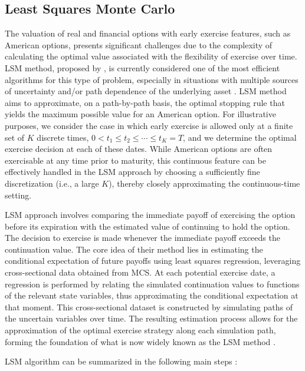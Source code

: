 \documentclass[pdflatex,sn-basic]{sn-jnl}%
\theoremstyle{thmstyleone}%
\theoremstyle{thmstyletwo}%
\theoremstyle{thmstylethree}%
\begin{document}
 

\subsection{Least Squares Monte Carlo}\label{subsec45}

The valuation of real and financial options with early exercise features, such as American options, presents significant challenges due to the complexity of calculating the optimal value associated with the flexibility of exercise over time. LSM method, proposed by \cite{ref14}, is currently considered one of the most efficient algorithms for this type of problem, especially in situations with multiple sources of uncertainty and/or path dependence of the underlying asset \citep{ref16, ref15}. LSM method aims to approximate, on a path-by-path basis, the optimal stopping rule that yields the maximum possible value for an American option. For illustrative purposes, we consider the case in which early exercise is allowed only at a finite set of $K$ discrete times, $0 < t_1 \leq t_2 \leq \cdots \leq t_K = T$, and we determine the optimal exercise decision at each of these dates. While American options are often exercisable at any time prior to maturity, this continuous feature can be effectively handled in the LSM approach by choosing a sufficiently fine discretization (i.e., a large $K$), thereby closely approximating the continuous-time setting.

LSM approach involves comparing the immediate payoff of exercising the option before its expiration with the estimated value of continuing to hold the option. The decision to exercise is made whenever the immediate payoff exceeds the continuation value. The core idea of their method lies in estimating the conditional expectation of future payoffs using least squares regression, leveraging cross-sectional data obtained from MCS. At each potential exercise date, a regression is performed by relating the simulated continuation values to functions of the relevant state variables, thus approximating the conditional expectation at that moment. This cross-sectional dataset is constructed by simulating paths of the uncertain variables over time. The resulting estimation process allows for the approximation of the optimal exercise strategy along each simulation path, forming the foundation of what is now widely known as the LSM method \citep{ref14}.

LSM algorithm can be summarized in the following main steps \citep{ref14, ref15}:
\end{document}
